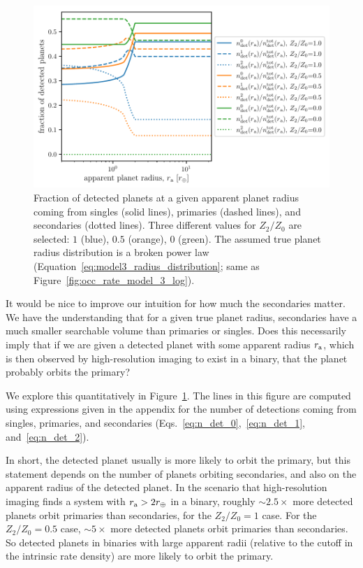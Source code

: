 \documentclass[12pt,modern]{aastex61}
\renewcommand{\a}{_{\rm a}}
\begin{document}
\begin{figure}[!t]
    \centering
    \includegraphics[width=\textwidth]{figures/ndet_vs_radius_logx_model_3_fraclines_rpu_22.5_manyZs.pdf}
    \caption{
        Fraction of detected planets at a given apparent planet radius
        coming from singles (solid lines), primaries (dashed lines),
        and secondaries (dotted lines).  Three different values for
        $Z_2/Z_0$ are selected: $1$ (blue), $0.5$ (orange), $0$
        (green).  The assumed true planet radius distribution is a
        broken power law
        (Equation~\ref{eq:model3_radius_distribution}; same as
        Figure~\ref{fig:occ_rate_model_3_log}).
    }
    \label{fig:frac_model_3}
\end{figure}

It would be nice to improve our intuition for how much the secondaries
matter.  We have the understanding that for a given true planet
radius, secondaries have a much smaller searchable volume than
primaries or singles.  Does this necessarily imply that if we are
given a detected planet with some apparent radius $r\a$, which is then
observed by high-resolution imaging to exist in a binary, that the
planet probably orbits the primary?

We explore this quantitatively in Figure~\ref{fig:frac_model_3}.  The
lines in this figure are computed using expressions given in the
appendix for the number of detections coming from singles, primaries,
and secondaries (Eqs.~\ref{eq:n_det_0},~\ref{eq:n_det_1},
and~\ref{eq:n_det_2}).

In short, the detected planet usually is more likely to orbit the
primary, but this statement depends on the number of planets orbiting
secondaries, and also on the apparent radius of the detected planet.
In the scenario that high-resolution imaging finds a system with $r\a
> 2r_\oplus$ in a binary, roughly $\sim\! 2.5\times$ more detected
planets orbit primaries than secondaries, for the $Z_2/Z_0=1$ case.
For the $Z_2/Z_0=0.5$ case, $\sim\! 5\times$ more detected planets
orbit primaries than secondaries.  So detected planets in binaries
with large apparent radii (relative to the cutoff in the intrinsic
rate density) are more likely to orbit the primary.
\end{document}
